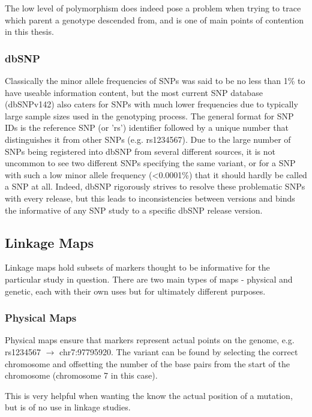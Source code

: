 The low level of polymorphism does indeed pose a problem when trying to trace which parent a genotype descended from, and is one of main points of contention in this thesis. 

\subsubsection{dbSNP}

Classically the minor allele frequencies of SNPs was said to be no less than 1\% to have useable information content, but the most current SNP database (dbSNPv142) also caters for SNPs with much lower frequencies due to typically large sample sizes used in the genotyping process. The general format for SNP IDs is the reference SNP (or 'rs') identifier followed by a unique number that distinguishes it from other SNPs (e.g. rs1234567).  Due to the large number of SNPs being registered into dbSNP from several different sources, it is not uncommon to see two different SNPs specifying the same variant, or for a SNP with such a low minor allele frequency (<0.0001\%) that it should hardly be called a SNP at all. Indeed, dbSNP rigorously strives to resolve these problematic SNPs with every release, but this leads to inconsistencies between versions and binds the informative of any SNP study to a specific dbSNP release version.


\subsection{Linkage Maps}

Linkage maps hold subsets of markers thought to be informative for the particular study in question. There are two main types of maps - physical and genetic, each with their own uses but for ultimately different purposes.


\subsubsection{Physical Maps}

Physical maps ensure that markers represent actual points on the genome, e.g. rs1234567 \(\rightarrow\) chr7:97795920. The variant can be found by selecting the correct chromosome and offsetting the number of the base pairs from the start of the chromosome (chromosome 7 in this case).

This is very helpful when wanting the know the actual position of a mutation, but is of no use in linkage studies.


